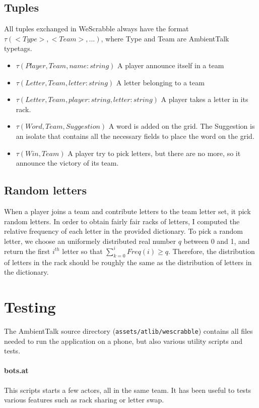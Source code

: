 \documentclass[a4paper,12pt]{article}
\begin{document}
\subsection{Tuples}
All tuples exchanged in WeScrabble always have the format $\tau(<Type>, <Team>, ...)$, where Type and Team are AmbientTalk typetags.
\begin{itemize}
  \item $\tau(Player, Team, name:string)$ A player announce itself in a team
  \item $\tau(Letter, Team, letter:string)$ A letter belonging to a team
  \item $\tau(Letter, Team, player:string, letter:string)$ A player takes a letter in its rack.
  \item $\tau(Word, Team, Suggestion)$ A word is added on the grid. The Suggestion is an isolate that contains all the necessary fields to place the word on the grid.
  \item $\tau(Win, Team)$ A player try to pick letters, but there are no more, so it announce the victory of its team.
\end{itemize}

\subsection{Random letters}
When a player joins a team and contribute letters to the team letter set, it pick random letters. In order to obtain fairly fair racks of letters, I computed the relative frequency of each letter in the provided dictionary. To pick a random letter, we choose an uniformely distributed real number $q$ between 0 and 1, and return the first $i^{th}$ letter so that $\sum_{k=0}^{i} Freq(i) \geq q$. Therefore, the distribution of letters in the rack should be roughly the same as the distribution of letters in the dictionary.


\section{Testing}
The AmbientTalk source directory (\texttt{assets/atlib/wescrabble}) contains all files needed to run the application on a phone, but also various utility scripts and tests.

\paragraph{bots.at} This scripts starts a few actors, all in the same team. It has been useful to tests various features such as rack sharing or letter swap.
\end{document}
